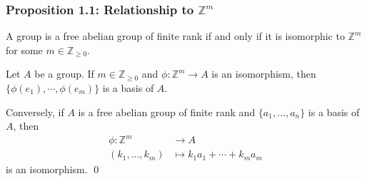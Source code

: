 \documentclass{article}
\renewenvironment{proof}{{\bfseries\color{blue1} Proof:}}{\qed}
\begin{document}
\subsubsection{Proposition 1.1: Relationship to $\mathbb{Z}^m$}
\begin{idea}
    A group is a free abelian group of finite rank if and only if it is isomorphic to $\mathbb{Z}^m$ for some $m\in \mathbb{Z}_{\ge 0}$.
\end{idea}
\begin{proof}
    Let $A$ be a group. If $m\in \mathbb{Z}_{\ge 0}$ and $\phi: \mathbb{Z}^m\rightarrow A$ is an isomorphism, then $\{\phi(e_1),\cdots,\phi(e_m)\}$ is a basis of $A$.

    Conversely, if $A$ is a free abelian group of finite rank and $\{a_1,\dots,a_n\}$ is a basis of $A$, then
    \begin{align*}
        \phi: \mathbb{Z}^m & \rightarrow A                    \\
        (k_1,\dots,k_m)    & \mapsto k_1a_1 + \cdots + k_ma_m
    \end{align*}
    is an isomorphism.
\end{proof}
\end{document}
